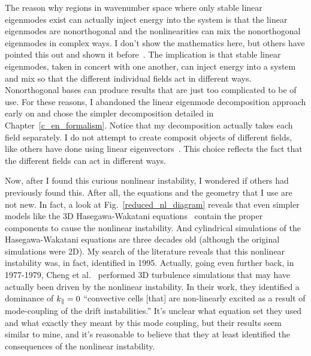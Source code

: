 The reason why regions in wavenumber space where only stable linear eigenmodes exist can actually inject energy into the system is that the 
linear eigenmodes are nonorthogonal and the nonlinearities can mix the nonorthogonal eigenmodes in complex ways. 
I don't show the mathematics here, but others have pointed this out and shown it before~\cite{camargo1998,kim2010}. The implication is that stable linear eigenmodes, 
taken in concert with one another, can inject energy into a system and mix so that the different individual fields act in different ways.
Nonorthogonal bases can produce results that are just too complicated to be of use.
For these reasons, I abandoned the linear eigenmode decomposition approach early on and chose the simpler decomposition detailed in Chapter~\ref{c_en_formalism}. 
Notice that my decomposition actually takes each field separately. I do not attempt
to create composit objects of different fields, like others have done using 
linear eigenvectors~\cite{baver2002,terry2002,terry2006a,terry2006b,gatto2006,terry2009,kim2010,makwana2011}. This choice reflects
the fact that the different fields can act in different ways.

Now, after I found this curious nonlinear instability, I wondered if others had previously found this. After all, the equations and the geometry that I use are not new. In fact, a look at 
Fig.~\ref{reduced_nl_diagram} reveals that even simpler models like the 3D Hasegawa-Wakatani equations~\cite{hasegawa1983} contain the proper components to cause the nonlinear instability. And 
cylindrical simulations of the Hasegawa-Wakatani equations are three decades old (although the original simulations were 2D).
My search of the literature reveals that this nonlinear instability was, in fact, identified in 1995. Actually, going even further back, in 1977-1979, 
Cheng et al.~\cite{cheng1977,cheng1979} performed 3D turbulence simulations that may have actually been driven by the nonlinear instability. 
In their work, they identified a dominance of $k_\parallel=0$ ``convective cells [that] are non-linearly excited as a result of mode-coupling of the drift instabilities.'' 
It's unclear what equation set they used
and what exactly they meant by this mode coupling, but their results seem similar to mine, and it's reasonable to believe that they at least identified the consequences of the nonlinear instability.

